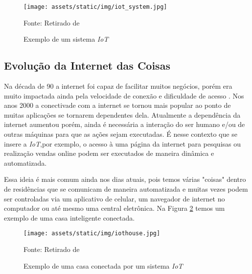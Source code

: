 \documentclass[../../layout.tex]{subfiles}
\begin{document}
\begin{figure}[H]
\centering
\caption{Exemplo de um sistema \emph{IoT}}
\texttt{[image: assets/static/img/iot\_system.jpg]}
\label{fig:iotsystem}

\begin{minipage}{0.5\textwidth}
\raggedright \footnotesize Fonte: Retirado de  
\end{minipage}
\end{figure}

\subsection{Evolução da Internet das Coisas}
\hspace*{3em}Na década de 90 a internet foi capaz de facilitar muitos negócios, porém era muito impactada ainda pela velocidade de conexão e dificuldade de acesso \cite{iot_evolution}. Nos anos 2000 a conectivade com a internet se tornou mais popular ao ponto de muitas aplicações se tornarem dependentes dela. Atualmente a dependência da internet aumentou porém, ainda é necessária a interação do ser humano e/ou de outras máquinas para que as ações sejam executadas. É nesse contexto que se insere a \emph{IoT},por exemplo, o acesso à uma página da internet para pesquisas ou realização vendas online podem ser executados de maneira dinâmica e automatizada. \par
\hspace*{3em}Essa ideia é mais comum ainda nos dias atuais, pois temos várias "coisas" dentro de residências que se comunicam de maneira automatizada e muitas vezes podem  ser controladas via um aplicativo de celular, um navegador de internet no computador ou até mesmo uma central eletrônica. Na Figura \ref{fig:iothou} temos um exemplo de uma casa inteligente conectada.

\begin{figure}[H]
\centering
\caption{Exemplo de uma casa conectada por um sistema \emph{IoT}}
\texttt{[image: assets/static/img/iothouse.jpg]}
\label{fig:iothou}

\begin{minipage}{0.5\textwidth}
\raggedright \footnotesize Fonte: Retirado de  
\end{minipage}
\end{figure}
\end{document}
